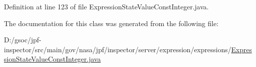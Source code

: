 Definition at line 123 of file Expression\+State\+Value\+Const\+Integer.\+java.



The documentation for this class was generated from the following file\+:\begin{DoxyCompactItemize}
\item 
D\+:/gsoc/jpf-\/inspector/src/main/gov/nasa/jpf/inspector/server/expression/expressions/\hyperlink{_expression_state_value_const_integer_8java}{Expression\+State\+Value\+Const\+Integer.\+java}\end{DoxyCompactItemize}
